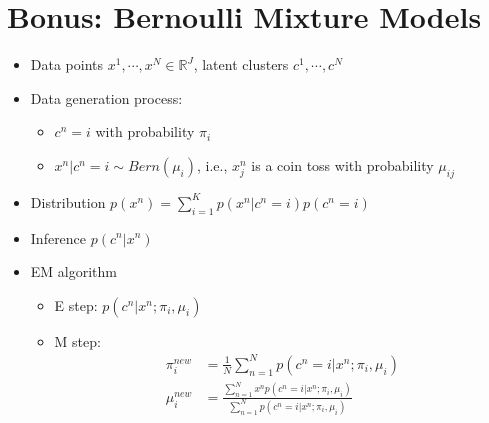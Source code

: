 \documentclass[10pt]{article}
\begin{document}
\section*{Bonus: Bernoulli Mixture Models}
\begin{itemize}
	\item Data points $x^1, \cdots, x^N \in \mathbb{R}^J$, latent clusters $c^1, \cdots, c^N$
	\item Data generation process:
	\begin{itemize}
	    \item $c^n = i$ with probability $\pi_i$
	    \item $x^n | c^n = i \sim Bern(\mu_i)$, i.e., $x_j^n$ is a coin toss with probability $\mu_{ij}$
    \end{itemize}
    \item Distribution $p(x^n) = \sum_{i = 1}^K p(x^n | c^n = i) p(c^n = i)$
    \item Inference $p(c^n | x^n)$
    \item EM algorithm
    \begin{itemize}
	    \item E step: $p(c^n | x^n; \pi_i, \mu_i)$
	    \item M step:
	    \begin{align*}
            \pi_i^{new} &= \frac{1}{N} \sum_{n = 1}^N p(c^n = i | x^n; \pi_i, \mu_i) \\
            \mu_i^{new} &= \frac{\sum_{n = 1}^N x^n p(c^n = i | x^n; \pi_i, \mu_i)}{\sum_{n = 1}^N p(c^n = i | x^n ; \pi_i, \mu_i)}
        \end{align*}
    \end{itemize}
\end{itemize}
\end{document}
